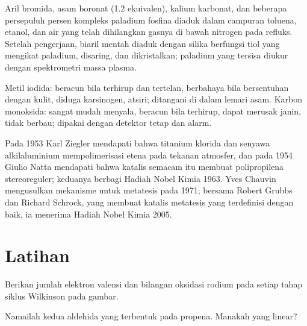 \begin{inthelab}
Aril bromida, asam boronat (1.2 ekuivalen), kalium karbonat, dan
beberapa persepuluh persen kompleks paladium fosfina diaduk dalam
campuran toluena, etanol, dan air yang telah dihilangkan gasnya di bawah nitrogen pada refluks. Setelah
pengerjaan, biaril mentah diaduk dengan silika berfungsi tiol yang
mengikat paladium, disaring, dan dikristalkan; paladium yang tersisa diukur dengan
spektrometri massa plasma.
\end{inthelab}

\begin{safety}{}
Metil iodida: beracun bila terhirup dan tertelan, berbahaya bila bersentuhan dengan kulit, diduga
karsinogen, atsiri; ditangani di dalam lemari asam. Karbon monoksida: sangat
mudah menyala, beracun bila terhirup, dapat merusak janin, tidak berbau; dipakai
dengan detektor tetap dan alarm.
\end{safety}

\begin{history}
Pada 1953 Karl Ziegler mendapati bahwa titanium klorida dan senyawa alkilaluminium
mempolimerisasi etena pada tekanan atmosfer, dan pada 1954 Giulio Natta mendapati bahwa katalis
semacam itu membuat polipropilena stereoreguler; keduanya berbagi Hadiah Nobel Kimia
1963. Yves Chauvin mengusulkan mekanisme  untuk
metatesis pada 1971; bersama Robert Grubbs dan Richard Schrock, yang membuat katalis
metatesis yang terdefinisi dengan baik, ia menerima Hadiah Nobel Kimia 2005.
\end{history}

\section{Latihan}

\begin{exercise}[$\star$]\label{exo:b3:homogeneous-catalysis:1}
Berikan jumlah elektron valensi dan bilangan oksidasi rodium pada setiap tahap
siklus Wilkinson pada gambar.
\end{exercise}

\begin{exercise}[$\star$]\label{exo:b3:homogeneous-catalysis:2}
Namailah kedua aldehida yang terbentuk pada  propena. Manakah yang
linear?
\end{exercise}

